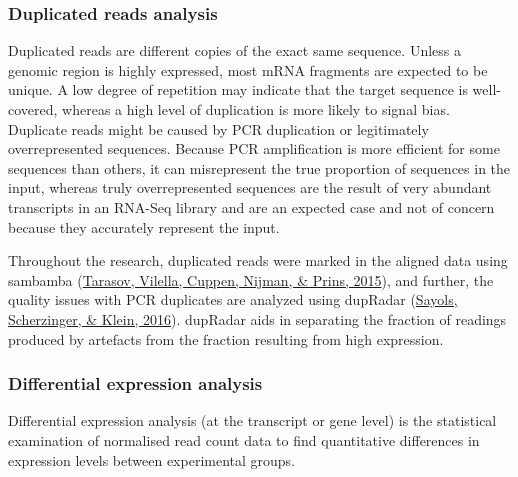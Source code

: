 \documentclass[12pt,twoside]{reedthesis}
\begin{document}
\hypertarget{m3.2.2}{%
\subsubsection*{Duplicated reads analysis}\label{m3.2.2}}

Duplicated reads are different copies of the exact same sequence. Unless
a genomic region is highly expressed, most mRNA fragments are expected
to be unique. A low degree of repetition may indicate that the target
sequence is well-covered, whereas a high level of duplication is more
likely to signal bias. Duplicate reads might be caused by PCR
duplication or legitimately overrepresented sequences. Because PCR
amplification is more efficient for some sequences than others, it can
misrepresent the true proportion of sequences in the input, whereas
truly overrepresented sequences are the result of very abundant
transcripts in an RNA-Seq library and are an expected case and not of
concern because they accurately represent the input.

Throughout the research, duplicated reads were marked in the aligned
data using sambamba (\protect\hyperlink{ref-tarasov2015}{Tarasov, Vilella, Cuppen, Nijman, \& Prins, 2015}), and further, the quality issues with
PCR duplicates are analyzed using dupRadar (\protect\hyperlink{ref-sayols2016}{Sayols, Scherzinger, \& Klein, 2016}). dupRadar aids
in separating the fraction of readings produced by artefacts from the
fraction resulting from high expression.

\hypertarget{m3.2.3}{%
\subsubsection*{Differential expression analysis}\label{m3.2.3}}

Differential expression analysis (at the transcript or gene level) is
the statistical examination of normalised read count data to find
quantitative differences in expression levels between experimental
groups.
\end{document}
